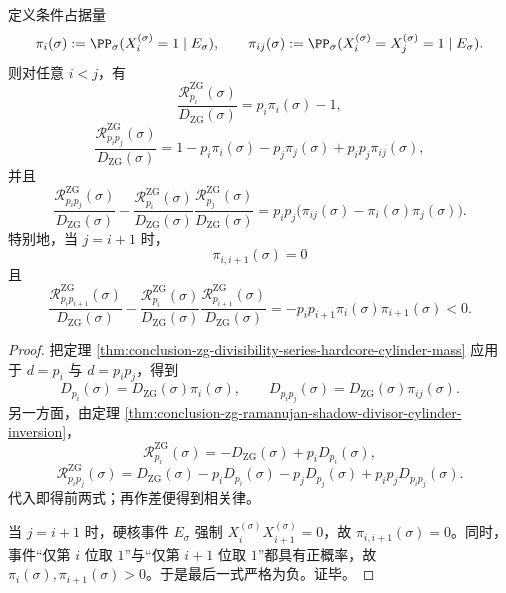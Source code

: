 \begin{theorem}\label{thm:conclusion-zg-prime-pair-shadow-correlation-law}
定义条件占据量
\[
\pi_i(\sigma):=\PP_\sigma(X_i^{(\sigma)}=1\mid E_\sigma),
\qquad
\pi_{ij}(\sigma):=\PP_\sigma(X_i^{(\sigma)}=X_j^{(\sigma)}=1\mid E_\sigma).
\]
则对任意 \(i<j\)，有
\[
\frac{\mathcal R_{p_i}^{\mathrm{ZG}}(\sigma)}{D_{\mathrm{ZG}}(\sigma)}
=
p_i\pi_i(\sigma)-1,
\]
\[
\frac{\mathcal R_{p_ip_j}^{\mathrm{ZG}}(\sigma)}{D_{\mathrm{ZG}}(\sigma)}
=
1-p_i\pi_i(\sigma)-p_j\pi_j(\sigma)+p_ip_j\pi_{ij}(\sigma),
\]
并且
\[
\frac{\mathcal R_{p_ip_j}^{\mathrm{ZG}}(\sigma)}{D_{\mathrm{ZG}}(\sigma)}
-
\frac{\mathcal R_{p_i}^{\mathrm{ZG}}(\sigma)}{D_{\mathrm{ZG}}(\sigma)}
\frac{\mathcal R_{p_j}^{\mathrm{ZG}}(\sigma)}{D_{\mathrm{ZG}}(\sigma)}
=
p_ip_j\bigl(\pi_{ij}(\sigma)-\pi_i(\sigma)\pi_j(\sigma)\bigr).
\]
特别地，当 \(j=i+1\) 时，
\[
\pi_{i,i+1}(\sigma)=0
\]
且
\[
\frac{\mathcal R_{p_ip_{i+1}}^{\mathrm{ZG}}(\sigma)}{D_{\mathrm{ZG}}(\sigma)}
-
\frac{\mathcal R_{p_i}^{\mathrm{ZG}}(\sigma)}{D_{\mathrm{ZG}}(\sigma)}
\frac{\mathcal R_{p_{i+1}}^{\mathrm{ZG}}(\sigma)}{D_{\mathrm{ZG}}(\sigma)}
=
-p_ip_{i+1}\pi_i(\sigma)\pi_{i+1}(\sigma)<0.
\]
\end{theorem}
\begin{proof}
把定理 \ref{thm:conclusion-zg-divisibility-series-hardcore-cylinder-mass} 应用于 \(d=p_i\) 与 \(d=p_ip_j\)，得到
\[
D_{p_i}(\sigma)=D_{\mathrm{ZG}}(\sigma)\pi_i(\sigma),
\qquad
D_{p_ip_j}(\sigma)=D_{\mathrm{ZG}}(\sigma)\pi_{ij}(\sigma).
\]
另一方面，由定理 \ref{thm:conclusion-zg-ramanujan-shadow-divisor-cylinder-inversion}，
\[
\mathcal R_{p_i}^{\mathrm{ZG}}(\sigma)=-D_{\mathrm{ZG}}(\sigma)+p_iD_{p_i}(\sigma),
\]
\[
\mathcal R_{p_ip_j}^{\mathrm{ZG}}(\sigma)
=
D_{\mathrm{ZG}}(\sigma)-p_iD_{p_i}(\sigma)-p_jD_{p_j}(\sigma)+p_ip_jD_{p_ip_j}(\sigma).
\]
代入即得前两式；再作差便得到相关律。

当 \(j=i+1\) 时，硬核事件 \(E_\sigma\) 强制 \(X_i^{(\sigma)}X_{i+1}^{(\sigma)}=0\)，故 \(\pi_{i,i+1}(\sigma)=0\)。同时，事件“仅第 \(i\) 位取 \(1\)”与“仅第 \(i+1\) 位取 \(1\)”都具有正概率，故 \(\pi_i(\sigma),\pi_{i+1}(\sigma)>0\)。于是最后一式严格为负。证毕。
\end{proof}

